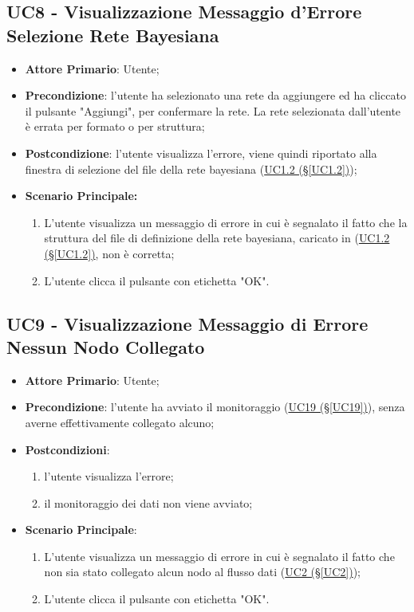 \pagebreak

\subsection{UC8 - Visualizzazione Messaggio d'Errore Selezione Rete Bayesiana}\label{UC8}
\begin{itemize}
\item \textbf{Attore Primario}: Utente;
\item \textbf{Precondizione}: l'utente ha selezionato una rete da aggiungere ed ha cliccato il pulsante "Aggiungi", per confermare la rete. La rete selezionata dall'utente è errata per formato o per struttura;
\item \textbf{Postcondizione}: l'utente visualizza l'errore, viene quindi riportato alla finestra di selezione del file della rete bayesiana (\hyperref[UC1.2]{UC1.2 (§\ref*{UC1.2})});
\item \textbf{Scenario Principale:} 
	\begin{enumerate}
	\item L'utente visualizza un messaggio di errore in cui è segnalato il fatto che la struttura del file di definizione della rete bayesiana, caricato in (\hyperref[UC1.2]{UC1.2 (§\ref*{UC1.2})}, non è corretta;
	\item L'utente clicca il pulsante con etichetta "OK".
	\end{enumerate}
\end{itemize}

\pagebreak

\subsection{UC9 - Visualizzazione Messaggio di Errore Nessun Nodo Collegato}\label{UC9}
\begin{itemize}
\item \textbf{Attore Primario}: Utente;
\item \textbf{Precondizione}: l'utente ha avviato il monitoraggio (\hyperref[UC19]{UC19 (§\ref*{UC19})}), senza averne effettivamente collegato alcuno;
\item \textbf{Postcondizioni}: 
	\begin{enumerate}
	\item l'utente visualizza l'errore;
	\item il monitoraggio dei dati non viene avviato;
	\end{enumerate}
\item \textbf{Scenario Principale}: 
	\begin{enumerate}
	\item L'utente visualizza un messaggio di errore in cui è segnalato il fatto che non sia stato collegato alcun 				nodo al flusso dati (\hyperref[UC2]{UC2 (§\ref*{UC2})});
	\item L'utente clicca il pulsante con etichetta "OK".
	\end{enumerate}
\end{itemize}

